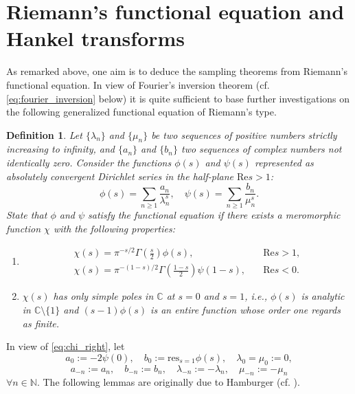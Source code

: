 \documentclass{article}
\newcommand{\assign}{:=}
\newtheorem{definition}{Definition}
\begin{document}
\section{Riemann's functional equation and Hankel
transforms}\label{sec:riemann}

As remarked above, one aim is to deduce the sampling theorems from Riemann's
functional equation. In view of Fourier's inversion theorem (cf.
\eqref{eq:fourier_inversion} below) it is quite sufficient to base further
investigations on the following generalized functional equation of Riemann's
type.

\begin{definition}
  \label{def:riemann_functional}Let $\{\lambda_n \}$ and $\{\mu_n \}$ be two
  sequences of positive numbers strictly increasing to infinity, and $\{a_n
  \}$ and $\{b_n \}$ two sequences of complex numbers not identically zero.
  Consider the functions $\phi (s)$ and $\psi (s)$ represented as absolutely
  convergent Dirichlet series in the half-plane $\mathrm{Re} s > 1$:
  \begin{equation}
    \phi (s) = \sum_{n \geq 1} \frac{a_n}{\lambda_n^s}, \quad \psi (s) =
    \sum_{n \geq 1} \frac{b_n}{\mu_n^s} . \label{eq:dirichlet_series}
  \end{equation}
  State that $\phi$ and $\psi$ satisfy the functional equation if there exists
  a meromorphic function $\chi$ with the following properties:
  \begin{enumerate}
    \item
    
    \begin{align}
      \chi (s) = \pi^{- s / 2} \Gamma \left( \frac{s}{2} \right) \phi (s), &
      \quad \mathrm{Re} s > 1,  \label{eq:chi_right}\\
      \chi (s) = \pi^{- (1 - s) / 2} \Gamma \left( \frac{1 - s}{2} \right)
      \psi (1 - s), & \quad \mathrm{Re} s < 0.  \label{eq:chi_left}
    \end{align}
    
    \item $\chi (s)$ has only simple poles in $\mathbb{C}$ at $s = 0$ and $s =
    1$, i.e., $\phi (s)$ is analytic in $\mathbb{C} \setminus \{1\}$ and $(s -
    1) \phi (s)$ is an entire function whose order one regards as finite.
  \end{enumerate}
\end{definition}

In view of \eqref{eq:chi_right}, let
\begin{equation}
  a_0 \assign - 2 \psi (0), \quad b_0 \assign \mathrm{res}_{s = 1} \phi (s),
  \quad \lambda_0 = \mu_0 \assign 0, \label{eq:residue_definition}
\end{equation}
\begin{equation}
  a_{- n} \assign a_n, \quad b_{- n} \assign b_n, \quad \lambda_{- n} \assign
  - \lambda_n, \quad \mu_{- n} \assign - \mu_n \label{eq:symmetric_extension}
\end{equation}
$\forall n \in \mathbb{N}$. The following lemmas are originally due to
Hamburger (cf. {\cite{4,11,19}}).
\end{document}
